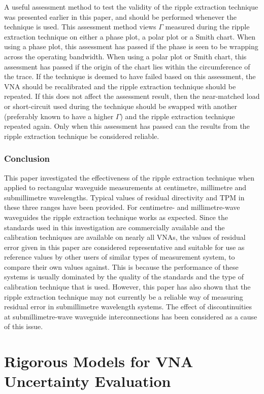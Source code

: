 \documentclass[../thesis/thesis.tex]{subfiles}
\begin{document}
\begin{refsection}
A useful assessment method to test the validity of the ripple extraction technique was presented earlier in this paper, and should be performed whenever the technique is used. This assessment method views $\Gamma$ measured during the ripple extraction technique on either a phase plot, a polar plot or a Smith chart. When using a phase plot, this assessment has passed if the phase is seen to be wrapping across the operating bandwidth. When using a polar plot or Smith chart, this assessment has passed if the origin of the chart lies within the circumference of the trace. If the technique is deemed to have failed based on this assessment, the VNA should be recalibrated and the ripple extraction technique should be repeated. If this does not affect the assessment result, then the near-matched load or short-circuit used during the technique should be swapped with another (preferably known to have a higher $\Gamma$) and the ripple extraction technique repeated again. Only when this assessment has passed can the results from the ripple extraction technique be considered reliable.

\subsubsection{Conclusion}

This paper investigated the effectiveness of the ripple extraction technique when applied to rectangular waveguide measurements at centimetre, millimetre and submillimetre wavelengths. Typical values of residual directivity and TPM in these three ranges have been provided. For centimetre- and millimetre-wave waveguides the ripple extraction technique works as expected. Since the standards used in this investigation are commercially available and the calibration techniques are available on nearly all VNAs, the values of residual error given in this paper are considered representative and suitable for use as reference values by other users of similar types of measurement system, to compare their own values against. This is because the performance of these systems is usually dominated by the quality of the standards and the type of calibration technique that is used. However, this paper has also shown that the ripple extraction technique may not currently be a reliable way of measuring residual error in submillimetre wavelength systems. The effect of discontinuities at submillimetre-wave waveguide interconnections has been considered as a cause of this issue.

\section{Rigorous Models for VNA Uncertainty Evaluation}

\end{refsection}
\end{document}
